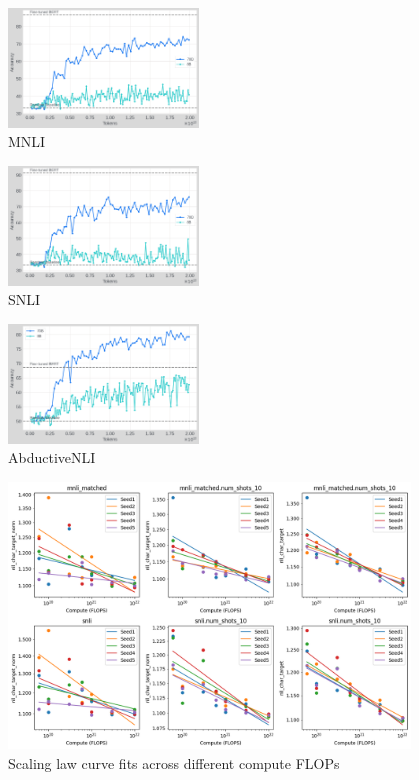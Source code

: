 \begin{figure}[t]
    \centering
    \includegraphics[width=0.45\textwidth]{nli_plots/mnli_matched_intermediate.png}
    \caption{MNLI}
    \label{fig:mnli_int}
\end{figure}

\begin{figure}[t]
    \centering
    \includegraphics[width=0.45\textwidth]{nli_plots/snli_intermediate.png}
    \caption{SNLI}
    \label{fig:snli_int}
\end{figure}

\begin{figure}[t]
    \centering
    \includegraphics[width=0.45\textwidth]{nli_plots/abductivenli_intermediate.png}
    \caption{AbductiveNLI}
    \label{fig:abductivenli_int}
\end{figure}

\begin{figure}[ht]
    \centering
    \includegraphics[width=0.95\textwidth]{nli_plots/sl_fits_mnli_snli.png}
    \caption{Scaling law curve fits across different compute FLOPs}
    \label{fig:sl_mnli_snli}
\end{figure}

